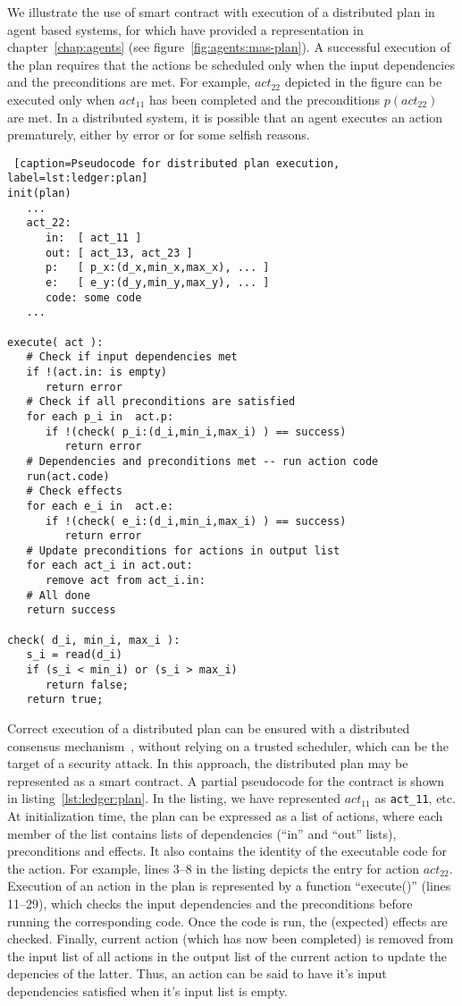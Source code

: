 We illustrate the use of smart contract with execution of a distributed plan in agent based systems, for which have provided a 
representation in chapter~\ref{chap:agents} (see figure~\ref{fig:agents:mas-plan}). A successful execution of the plan requires 
that the actions be scheduled only when the input dependencies and the preconditions are met. 
For example, $act_{22}$ depicted in the figure can be executed only when $act_{11}$ has been completed and the preconditions 
$p(act_{22})$ are met. In a distributed system, it is possible that an agent executes an action prematurely, either by error 
or for some selfish reasons. 

\begin{lstlisting} [caption=Pseudocode for distributed plan execution, label=lst:ledger:plan]
init(plan)
   ...
   act_22:
      in:  [ act_11 ]  
      out: [ act_13, act_23 ]
      p:   [ p_x:(d_x,min_x,max_x), ... ] 
      e:   [ e_y:(d_y,min_y,max_y), ... ]  
      code: some code
   ...

execute( act ):
   # Check if input dependencies met 
   if !(act.in: is empty)
      return error
   # Check if all preconditions are satisfied 
   for each p_i in  act.p: 
      if !(check( p_i:(d_i,min_i,max_i) ) == success)
         return error
   # Dependencies and preconditions met -- run action code 
   run(act.code)
   # Check effects
   for each e_i in  act.e:
      if !(check( e_i:(d_i,min_i,max_i) ) == success) 
         return error 
   # Update preconditions for actions in output list
   for each act_i in act.out:
      remove act from act_i.in: 
   # All done
   return success

check( d_i, min_i, max_i ):
   s_i = read(d_i)
   if (s_i < min_i) or (s_i > max_i)
      return false;
   return true;
\end{lstlisting}

Correct execution of a distributed plan can be ensured with a distributed consensus mechanism~\citep{Shukla:2018}, without relying 
on a trusted scheduler, which can be the target of a security attack. In this approach, the distributed plan may be represented 
as a smart contract. A partial pseudocode for the contract is shown in listing~\ref{lst:ledger:plan}. In the listing, 
we have represented $act_{11}$ as \texttt{act\_11}, etc.  
%
At initialization time, the plan can be expressed as a list of actions, where each member of the list contains lists of 
dependencies (``in'' and ``out'' lists), preconditions and effects. It also contains the identity of the executable code  
for the action. For example, lines 3--8 in the listing depicts the entry for action $act_{22}$.
%
Execution of an action in the plan is represented by a function ``execute()'' (lines 11--29), which checks the input dependencies and 
the preconditions before running the corresponding code. Once the code is run, the (expected) effects are checked. Finally, current 
action (which has now been completed) is removed from the input list of all actions in the output list of the current action to update 
the depencies of the latter.  Thus, an action can be said to have it's input dependencies satisfied when it's input list is empty.

